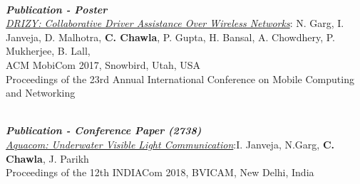 \documentclass[11pt]{res} %
\newcommand{\titlegap}{5pt} %
\newcommand{\sectgap}{0.05in} %
\begin{document}
\begin{resume}
\\
\textbf{\textit{Publication - Poster}}\\ \textcolor{blue}{\textit{\href{https://dl.acm.org/doi/10.1145/3117811.3131255}{DRIZY: Collaborative Driver Assistance Over Wireless Networks}}}:\hspace{0.3cm} N. Garg, I. Janveja, D. Malhotra, \textbf{C. Chawla}, P. Gupta, H. Bansal, A. Chowdhery, P. Mukherjee, B. Lall, \\
ACM MobiCom 2017, Snowbird, Utah, USA
\\Proceedings of the 23rd Annual International Conference on Mobile Computing and Networking

\\
\textbf{\textit{Publication - Conference Paper (2738)}}\\ \textcolor{blue}{\textit{\href{http://bvicam.in/INDIACom/news/INDIACom\%202018\%20Proceedings/Main/papers.html}{Aquacom: Underwater Visible Light Communication}}}:\hfill I. Janveja, N.Garg, \textbf{C. Chawla}, J. Parikh\\
Proceedings of the 12th INDIACom 2018, BVICAM, New Delhi, India
\vspace{\sectgap} 
\hline











\end{resume}
\end{document}
